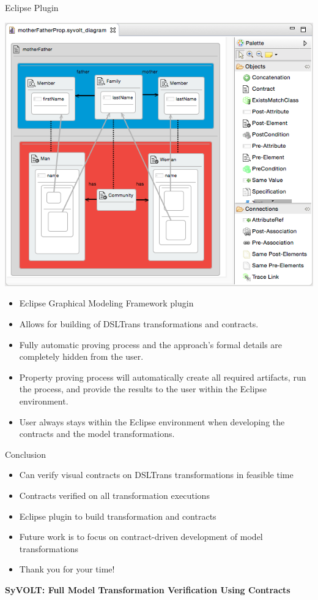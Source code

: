 \documentclass[xcolor=dvipsnames, 12pt, handout]{beamer}
\begin{document}
\begin{frame}{Eclipse Plugin}
\begin{center}
\includegraphics[width=\textwidth]{figures/eclipse_frontend}
\end{center}

\begin{itemize}
\item Eclipse Graphical Modeling Framework plugin
\item Allows for building of DSLTrans transformations and contracts.
\item Fully automatic proving process and the approach's formal details are completely hidden from the user.
\item Property proving process will automatically
            create all required artifacts, run
            the process, and provide the results to the user within the
            Eclipse environment.
\item User always stays within the Eclipse
            environment when developing the contracts and the model
            transformations.
\end{itemize}
\end{frame}

\begin{frame}{Conclusion}
\begin{itemize}[<+->]
\item Can verify visual contracts on DSLTrans transformations in feasible time
\item Contracts verified on all transformation executions
\item Eclipse plugin to build transformation and contracts
\item Future work is to focus on contract-driven development of model transformations
\end{itemize}
\pause
\begin{itemize}
\item Thank you for your time!
\end{itemize}
\begin{center}
\textbf{SyVOLT: Full Model Transformation Verification Using Contracts}\\
\end{center}
\end{frame}
\end{document}
